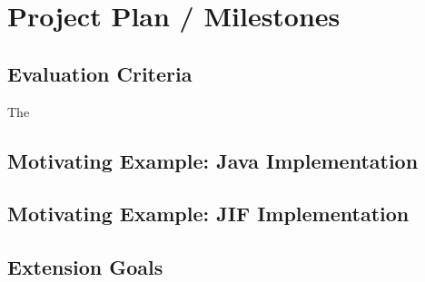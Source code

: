 \section{Project Plan / Milestones}

\subsection{Evaluation Criteria}

The 

\subsection{Motivating Example: Java Implementation}

\subsection{Motivating Example: JIF Implementation}

\subsection{Extension Goals}